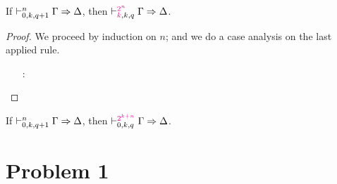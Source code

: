 \documentclass[a4paper]{article}
\begin{document}
\begin{lemma}\label{0005}
  If $\mathrel{\vdash^{n}_{0,k,q+1}} \Gamma \Rightarrow \Delta$, then $\mathrel{\vdash^{\textcolor{magenta}{2^n}}_{\textcolor{magenta}{k},k,q}} \Gamma \Rightarrow \Delta$.
\end{lemma}
\begin{proof}
  We proceed by induction on $n$; and we do a case analysis on the last applied rule.
  \begin{itemize}
  \item[\rCut:] 
  \end{itemize}
\end{proof}

\begin{corollary}
  If $\mathrel{\vdash^{n}_{0,k,q+1}} \Gamma \Rightarrow \Delta$, then $\mathrel{\vdash^{\textcolor{magenta}{2^{k+n}}}_{0,k,q}} \Gamma \Rightarrow \Delta$.
\end{corollary}

\section*{Problem 1}
\label{0001}

% 
% 
\end{document}
